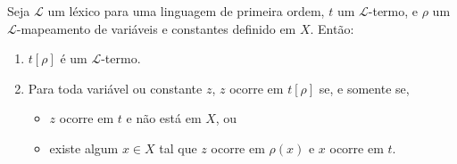 \begin{metalemma}\label{mlem:substituicaoEmTermos}
    Seja $\mathcal L$ um léxico para uma linguagem de primeira ordem, $t$ um $\mathcal L$-termo, e $\rho$ um $\mathcal L$-mapeamento de variáveis e constantes definido em $X$.
    Então:
    \begin{enumerate}[label=(\alph*)]
        \item $t[\rho]$ é um $\mathcal L$-termo.
        \item Para toda variável ou constante $z$, $z$ ocorre em $t[\rho]$ se, e somente se,
        \begin{itemize}
            \item $z$ ocorre em $t$ e não está em $X$, ou
            \item existe algum $x \in X$ tal que $z$ ocorre em $\rho(x)$ e $x$ ocorre em $t$.
        \end{itemize}
    \end{enumerate}
\end{metalemma}
